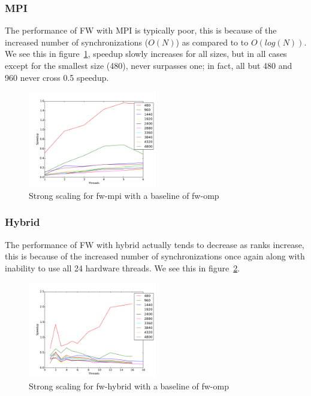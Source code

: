\subsubsection{MPI}

The performance of FW with MPI is typically poor, this is because of the increased number of synchronizations ($O(N)$) as compared to to $O(log(N))$. We see this in figure~\ref{strong-fw-mpi}, speedup slowly increases for all sizes, but in all cases except for the smallest size (480), never surpasses one; in fact, all but 480 and 960 never cross 0.5 speedup.

\begin{figure}[ht]
\centering
\includegraphics[width=0.5\textwidth]{plots/strong_fw-mpi_baseline-fw-omp--1.pdf}
\caption{Strong scaling for fw-mpi with a baseline of fw-omp}
\label{strong-fw-mpi}
\end{figure}

\subsubsection{Hybrid}

The performance of FW with hybrid actually tends to decrease as ranks increase, this is because of the increased number of synchronizations once again along with inability to use all 24 hardware threads. We see this in figure~\ref{strong-fw-hybrid}.

\begin{figure}[ht]
\centering
\includegraphics[width=0.5\textwidth]{plots/strong_fw-hybrid_baseline-fw-omp--1.pdf}
\caption{Strong scaling for fw-hybrid with a baseline of fw-omp}
\label{strong-fw-hybrid}
\end{figure}
